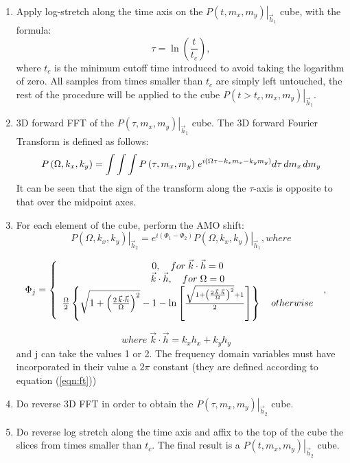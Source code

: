 \begin{enumerate}
\item Apply log-stretch along the time axis on the $\left. {P\left( {t,m_x ,m_y } \right)} \right|_{\vec h_1 }$ cube, with the formula:
\begin{equation}
\label{eqn:logstretch}
\tau  = \ln \left( {\frac{t}{{t_c }}} \right),
\end{equation}
where $t_c$ is the minimum cutoff time introduced to avoid taking the logarithm of zero. All samples from times smaller than $t_c$ are simply left untouched, the rest of the procedure will be applied to the cube $\left. {P\left( {t > t_c,m_x ,m_y } \right)} \right|_{\vec h_1 }$.
\item 3D forward FFT of the $\left. {P\left( {\tau,m_x ,m_y } \right)} \right|_{\vec h_1 }$ cube. The 3D forward Fourier Transform is defined as follows:
\begin{equation}
\label{eqn:ft}
P\left( {\Omega ,k_x ,k_y } \right) = \int {\int {\int {P\left( {\tau ,m_x ,m_y } \right)} } } \;e^{i\left( {\Omega \tau  - k_x m_x  - k_y m_y } \right)} d\tau \,dm_x {\kern 1pt} dm_y 
\end{equation}
It can be seen that the sign of the transform along the $\tau$-axis is opposite to that over the midpoint axes.
\item For each element of the cube, perform the AMO shift:
\begin{equation}
\label{eqn:amo}
 \left. {P\left( {\Omega ,k_x ,k_y } \right)} \right|_{\vec h_2 }  =
 e^{i\left( {\Phi _1  - \Phi _2 } \right)} \left. {P\left( {\Omega
 ,k_x ,k_y } \right)} \right|_{\vec h_1 } , where
\end{equation}

\begin{equation}
\label{eqn:amophi}
 \Phi _j  = \left\{ {\begin{array}{*{20}c}
   {0,\quad for\;\vec k \cdot \vec h = 0}  \\
   {\vec k \cdot \vec h,\quad for\;\Omega  = 0}  \\
   {\frac{\Omega }{2}\left\{ {\sqrt {1 + \left( {\frac{{2\,\vec k \cdot \vec h}}{\Omega }} \right)^2 }  - 1 - \ln \left[ {\frac{{\sqrt {1 + \left( {\frac{{2\,\vec k \cdot \vec h}}{\Omega }} \right)^2 }  + 1}}{2}} \right]} \right\}\quad otherwise}  \\
\end{array}\;} \right.,\quad
\end{equation}

\begin{equation}
\label{eqn:amophi}
where \; \vec k \cdot \vec h = k_x h_x  + k_y h_y \quad
\end{equation}
 and j can take the values 1 or 2.
The frequency domain variables must have incorporated in their value a $2\pi$ constant (they are defined according to equation (\ref{eqn:ft}))
\item Do reverse 3D FFT in order to obtain the $\left. {P\left( {\tau,m_x ,m_y } \right)} \right|_{\vec h_2 }$ cube.
\item Do reverse log stretch along the time axis and affix to the top of the cube the slices from times smaller than $t_c$. The final result is a $\left. {P\left( {t,m_x ,m_y } \right)} \right|_{\vec h_2 }$ cube.
\end{enumerate}
